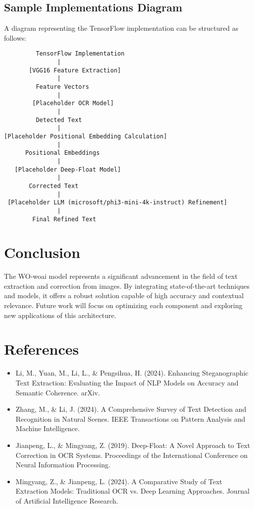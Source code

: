 \documentclass{article}
\begin{document}
\subsection{Sample Implementations Diagram}
A diagram representing the TensorFlow implementation can be structured as follows:

\begin{verbatim}
         TensorFlow Implementation
               |
       [VGG16 Feature Extraction]
               |
         Feature Vectors
               |
        [Placeholder OCR Model]
               |
         Detected Text
               |
[Placeholder Positional Embedding Calculation]
               |
      Positional Embeddings
               |
   [Placeholder Deep-Float Model]
               |
       Corrected Text
               |
 [Placeholder LLM (microsoft/phi3-mini-4k-instruct) Refinement]
               |
        Final Refined Text
\end{verbatim}

\section{Conclusion}
The WO-woai model represents a significant advancement in the field of text extraction and correction from images. By integrating state-of-the-art techniques and models, it offers a robust solution capable of high accuracy and contextual relevance. Future work will focus on optimizing each component and exploring new applications of this architecture.

\section{References}
\begin{itemize}
    \item Li, M., Yuan, M., Li, L., \& Pengsihua, H. (2024). Enhancing Steganographic Text Extraction: Evaluating the Impact of NLP Models on Accuracy and Semantic Coherence. arXiv.
    \item Zhang, M., \& Li, J. (2024). A Comprehensive Survey of Text Detection and Recognition in Natural Scenes. IEEE Transactions on Pattern Analysis and Machine Intelligence.
    \item Jianpeng, L., \& Mingyang, Z. (2019). Deep-Float: A Novel Approach to Text Correction in OCR Systems. Proceedings of the International Conference on Neural Information Processing.
    \item Mingyang, Z., \& Jianpeng, L. (2024). A Comparative Study of Text Extraction Models: Traditional OCR vs. Deep Learning Approaches. Journal of Artificial Intelligence Research.	
    \
\end{itemize}
\end{document}
